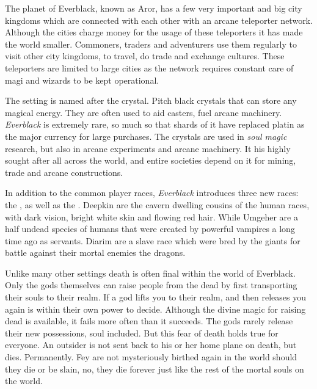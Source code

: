 \begin{enumerate}
  The planet of Everblack, known as Aror, has a
 few very important and big city kingdoms which are connected with each other
 with an arcane teleporter network. Although the cities charge money for the
 usage of these teleporters it has made the world smaller. Commoners, traders
 and adventurers use them regularly to visit other city kingdoms, to travel,
 do trade and exchange cultures. These teleporters are limited to large cities
 as the network requires constant care of magi and wizards to be kept
 operational.

  The setting is named after the 
 crystal. Pitch black crystals that can store any magical energy. They are
 often used to aid casters, fuel arcane machinery. \emph{Everblack} is
 extremely rare, so much so that shards of it have replaced platin as the
 major currency for large purchases. The crystals are used in \emph{soul
 magic} research, but also in arcane experiments and arcane machinery. It his
 highly sought after all across the world, and entire societies depend on it
 for mining, trade and arcane constructions.

  In addition to the common player races, \emph{Everblack}
 introduces three new races: the , 
 as well as the . Deepkin are the cavern dwelling cousins
 of the human races, with dark vision, bright white skin and flowing red
 hair. While Umgeher are a half undead species of humans that were created by
 powerful vampires a long time ago as servants. Diarim are a slave race which
 were bred by the giants for battle against their mortal enemies the dragons.

  Unlike many other settings death is often final
 within the world of Everblack. Only the gods themselves can raise people from
 the dead by first transporting their souls to their realm. If a god lifts you
 to their realm, and then releases you again is within their own power to
 decide. Although the divine magic for raising dead is available, it fails more
 often than it succeeds. The gods rarely release their new possessions, soul
 included. But this fear of death holds true for everyone. An outsider is not
 sent back to his or her home plane on death, but dies. Permanently. Fey are
 not mysteriously birthed again in the world should they die or be slain, no,
 they die forever just like the rest of the mortal souls on the world.

\end{enumerate}

